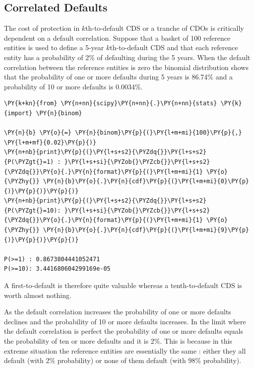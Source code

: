 \subsection{Correlated Defaults}\label{correlated-defaults}
The cost of protection in $k$th-to-default CDS or a tranche of CDOs is critically dependent
on a default correlation. Suppose that a basket of 100 reference entities is used to define a 5-year
$k$th-to-default CDS and that each reference entity has a probability of 2\% of defaulting during the 
5 years. When the default correlation between the reference entities is zero the binomial distribution 
shows that the probability of one or more defaults during 5 years is 86.74\% and a probability of 
10 or more defaults is 0.0034\%.

\begin{tcolorbox}[breakable, size=fbox, boxrule=1pt, pad at break*=1mm,colback=cellbackground, colframe=cellborder]
\begin{Verbatim}[commandchars=\\\{\}]
\PY{k+kn}{from} \PY{n+nn}{scipy}\PY{n+nn}{.}\PY{n+nn}{stats} \PY{k}{import} \PY{n}{binom}

\PY{n}{b} \PY{o}{=} \PY{n}{binom}\PY{p}{(}\PY{l+m+mi}{100}\PY{p}{,} \PY{l+m+mf}{0.02}\PY{p}{)}
\PY{n+nb}{print}\PY{p}{(}\PY{l+s+s2}{\PYZdq{}}\PY{l+s+s2}{P(\PYZgt{}=1) : }\PY{l+s+si}{\PYZob{}\PYZcb{}}\PY{l+s+s2}{\PYZdq{}}\PY{o}{.}\PY{n}{format}\PY{p}{(}\PY{l+m+mi}{1} \PY{o}{\PYZhy{}} \PY{n}{b}\PY{o}{.}\PY{n}{cdf}\PY{p}{(}\PY{l+m+mi}{0}\PY{p}{)}\PY{p}{)}\PY{p}{)}
\PY{n+nb}{print}\PY{p}{(}\PY{l+s+s2}{\PYZdq{}}\PY{l+s+s2}{P(\PYZgt{}=10): }\PY{l+s+si}{\PYZob{}\PYZcb{}}\PY{l+s+s2}{\PYZdq{}}\PY{o}{.}\PY{n}{format}\PY{p}{(}\PY{l+m+mi}{1} \PY{o}{\PYZhy{}} \PY{n}{b}\PY{o}{.}\PY{n}{cdf}\PY{p}{(}\PY{l+m+mi}{9}\PY{p}{)}\PY{p}{)}\PY{p}{)}

P(>=1) : 0.8673804441052471
P(>=10): 3.441680604299169e-05
\end{Verbatim}
\end{tcolorbox}

A first-to-default is therefore quite valuable whereas a tenth-to-default CDS is worth almost nothing.

As the default correlation increases the probability of one or more defaults declines and the probability 
of 10 or more defaults increases. In the limit where the default correlation is perfect the probability of one 
or more defaults equals the probability of ten or more defaults and it is 2\%. This is because in this extreme
situation the reference entities are essentially the same : either they all default (with 2\% probability) or none of them default (with 98\% probability).

